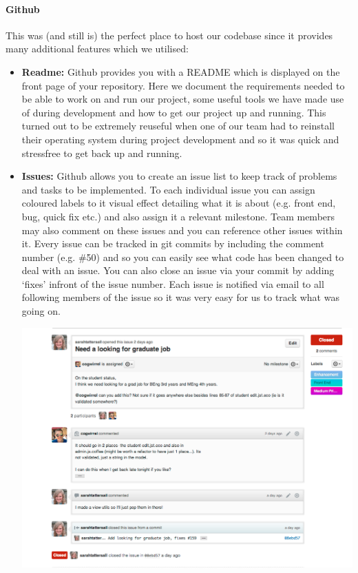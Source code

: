     \paragraph{Github\cite{github}} This was (and still is) the perfect place to host our codebase since it provides many additional features which we utilised:
    \begin{itemize}
        \item \textbf{Readme:} Github provides you with a README which is displayed on the front page of your repository. Here we document the requirements needed to be able to work on and run our project, some useful tools we have made use of during development and how to get our project up and running. This turned out to be extremely reuseful when one of our team had to reinstall their operating system during project development and so it was quick and stressfree to get back up and running.
        \item \textbf{Issues:} Github allows you to create an issue list to keep track of problems and tasks to be implemented. To each individual issue you can assign coloured labels to it visual effect detailing what it is about (e.g. front end, bug, quick fix etc.) and also assign it a relevant milestone. Team members may also comment on these issues and you can reference other issues within it. Every issue can be tracked in git commits by including the comment number (e.g. \#50) and so you can easily see what code has been changed to deal with an issue. You can also close an issue via your commit by adding `fixes' infront of the issue number. Each issue is notified via email to all following members of the issue so it was very easy for us to track what was going on. 

        \begin{center}
        \includegraphics[scale=0.3]{images/project_management/team_management/graduate_issue}


\end{center}
\end{itemize}
